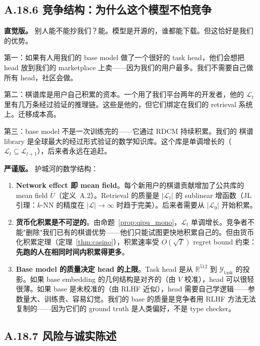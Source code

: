 \documentclass[11pt,a4paper]{article}
\theoremstyle{definition}
\theoremstyle{remark}
\begin{document}
\subsection{A.18.6 竞争结构：为什么这个模型不怕竞争}

\textbf{直觉版。}
别人能不能抄我们？能。模型是开源的，谁都能下载。但这恰好是我们的优势。

第一：如果有人用我们的 base model 做了一个很好的 task head，他们会想把 head 放到我们的 marketplace 上卖——因为我们的用户最多。我们不需要自己做所有 head，社区会做。

第二：棋谱库是用户自己积累的资本。一个用了我们平台两年的开发者，他的 $\mathcal{L}_t$ 里有几万条经过验证的推理链。这些是他的，但它们绑定在我们的 retrieval 系统上。迁移成本高。

第三：base model 不是一次训练完的——它通过 RDCM 持续积累。我们的 棋谱 library 是全球最大的经过形式验证的数学知识库。这个库是单调增长的（$\mathcal{L}_t \subseteq \mathcal{L}_{t+1}$），后来者永远在追赶。

\textbf{严谨版。}
护城河的数学结构：

\begin{enumerate}[nosep]
\item \textbf{Network effect 即 mean field}。每个新用户的棋谱贡献增加了公共库的 mean field $\overline{U}$（定义~A.2）。Retrieval 的质量是 $|\mathcal{L}_t|$ 的 sublinear 增函数（JL 引理：$k$-NN 的精度在 $|\mathcal{L}| \to \infty$ 时趋于完美）。后来者需要从 $|\mathcal{L}_0|$ 开始积累。

\item \textbf{货币化积累是不可逆的}。由命题~\ref{prop:qipu_mono}，$\mathcal{L}_t$ 单调增长。竞争者不能"删除"我们已有的棋谱优势——他们只能试图更快地积累自己的。但由货币化积累定理（定理~\ref{thm:casino}），积累速率受 $O(\sqrt{T})$ regret bound 约束：\textbf{先跑的人在相同时间内积累得更多}。

\item \textbf{Base model 的质量决定 head 的上限}。Task head 是从 $\mathbb{R}^{512}$ 到 $\mathcal{Y}_{\mathrm{task}}$ 的投影。如果 base embedding 的几何结构是对齐的（由 $V$ 校准），head 可以很轻很薄。如果 base 是未校准的（由 RLHF 近似），head 需要自己学逻辑——参数量大、训练贵、容易幻觉。我们的 base 的质量是竞争者用 RLHF 方法无法复制的——因为它们的 ground truth 是人类偏好，不是 type checker。
\end{enumerate}


\subsection{A.18.7 风险与诚实陈述}
\end{document}
